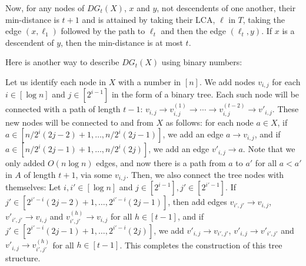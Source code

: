 Now, for any nodes of $DG_t(X)$, $x$ and $y$, not descendents of one another, their min-distance is $t+1$ and is attained by taking their LCA, $\ell$ in $T$, taking the edge $(x,\ell_1)$ followed by the path to $\ell_t$ and then the edge $(\ell_t,y)$. If $x$ is a descendent of $y$, then the min-distance is at most $t$.

Here is another way to describe $DG_t(X)$ using binary numbers:

Let us identify each node in $X$ with a number in $[n]$.
We add nodes $v_{i,j}$ for each $i \in [\log{n}]$ and $j \in [2^{i-1}]$ in the form of a binary tree.
Each such node will be connected with a path of length $t-1$: $v_{i,j} \to v_{i,j}^{(1)} \to \cdots \to v_{i,j}^{(t-2)} \to v'_{i,j}$.
These new nodes will be connected to and from $X$ as follows:
for each node $a \in X$, if $a \in [n/2^i (2j-2)+1,\ldots,n/2^i (2j-1)]$, we add an edge $a \to v_{i,j}$, and if $a \in [n/2^i (2j-1)+1,\ldots,n/2^i (2j)]$, we add an edge $v'_{i,j} \to a$.
Note that we only added $O(n \log{n})$ edges, and now there is a path from $a$ to $a'$ for all $a<a'$ in $A$ of length $t+1$, via some $v_{i,j}$.
Then, we also connect the tree nodes with themselves: Let $i,i' \in [\log{n}]$ and $j \in [2^{i-1}], j' \in [2^{i'-1}]$. If $j' \in [2^{i'-i} (2j-2)+1, \ldots,  2^{i'-i} (2j-1)]$, then add edges $v_{i',j'}\to v_{i,j}$, $v'_{i',j'} \to v_{i,j}$ and $v^{(h)}_{i',j'} \to v_{i,j}$ for all  $h \in [t-1]$, and if $j' \in [2^{i'-i} (2j-1)+1, \ldots,  2^{i'-i} (2j)]$, we add $v'_{i,j}\to v_{i',j'}$, $v'_{i,j} \to v'_{i',j'}$ and $v'_{i,j}\to v^{(h)}_{i',j'}$ for all  $h \in [t-1]$.
This completes the construction of this tree structure. 



